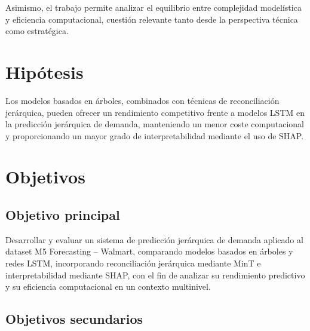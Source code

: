 \documentclass[IB,BIB]{TFUOC}%
\begin{document}
Asimismo, el trabajo permite analizar el equilibrio entre complejidad
modelística y eficiencia computacional, cuestión relevante tanto desde
la perspectiva técnica como estratégica.

\newpage

\section{Hipótesis}

Los modelos basados en árboles, combinados con técnicas de
reconciliación jerárquica, pueden ofrecer un rendimiento competitivo
frente a modelos LSTM en la predicción jerárquica de demanda,
manteniendo un menor coste computacional y proporcionando un mayor grado
de interpretabilidad mediante el uso de SHAP.

\section{Objetivos}

\subsection{Objetivo principal}

Desarrollar y evaluar un sistema de predicción jerárquica de demanda
aplicado al dataset M5 Forecasting -- Walmart, comparando modelos
basados en árboles y redes LSTM, incorporando reconciliación jerárquica
mediante MinT e interpretabilidad mediante SHAP, con el fin de analizar
su rendimiento predictivo y su eficiencia computacional en un contexto
multinivel.

\subsection{Objetivos secundarios}
\end{document}
